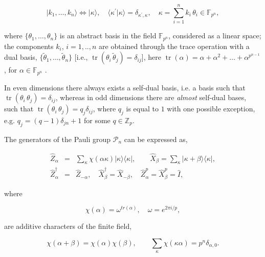 \documentclass[quantumrep,article,submit,pdftex,moreauthors]{Definitions/mdpi}
\DeclareMathOperator{\tr}{tr}
\begin{document}
\begin{equation}
  |k_{1}, \ldots, k_{n}\rangle
  \Leftrightarrow |\kappa\rangle, \quad \langle\kappa^{\prime}|\kappa\rangle
  = \delta_{\kappa^{\prime},\kappa}, \quad \kappa =
  \sum_{i=1}^{n} k_{i} \, \theta_{i} \in \mathbb{F}_{p^{n}},
  \label{basis}
\end{equation}

where $\{\theta_{1},\ldots,\theta_{n}\}$ is an abstract basis in the field
$\mathbb{F}_{p^{n}}$, considered as a linear space; the components $k_{i}$,
$i=1,..,n$ are obtained through the trace operation with a dual basis, $\{
\tilde{\theta}_{1},\ldots ,\tilde{\theta}_{n}\}$ [i.e., $\tr(\theta _{i}\,
\tilde{\theta}_{j})=\delta _{ij}$], here $\tr(\alpha) = \alpha
+\alpha^{2}+\ldots + \alpha ^{p^{n-1}}$, for $\alpha \in \mathbb{F}_{p^{n}}$
\cite{FF}.

In even dimensions there always exists a self-dual basis, i.e. a basis such that
$\tr(\theta_{i}\,\theta_{j})=\delta_{ij}$, whereas in odd dimensions there are
\textit{almost} self-dual bases, such that
$\tr(\theta_{i}\,\theta_{j})=q_{j}\delta_{ij}$, where $q_{j}$ is equal to $1$
with one possible exception, e.g. $q_{j} = (q-1)\delta_{jn}+1$ for some $q \in
\mathbb{Z}_p$.

The generators of the Pauli group $\mathcal{P}_{n}$ can be expressed as,

\begin{eqnarray}
  \hat{Z}_{\alpha }
  &=& \sum_{\kappa } \chi\left( \alpha \kappa \right)
  |\kappa \rangle \langle \kappa|,
  \qquad \hat{X}_{\beta }
  = \sum_{\kappa} |\kappa + \beta \rangle \langle \kappa|,
  \label{XZ} \\
  \hat{Z}_{\alpha }^{\dagger}
  &=& \hat{Z}_{-\alpha}, \quad \hat{X}_{\beta }^{\dagger}
  = \hat{X}_{-\beta}, \quad \hat{Z}_{\alpha}^{p}
  = \hat{X}_{\beta}^{p} = \hat{I},
\end{eqnarray}

where

\begin{equation*}
  \chi \left( \alpha \right)
  = \omega^{tr\left( \alpha \right)},
  \quad \omega = e^{2\pi i / p},
\end{equation*}

are additive characters of the finite field,

\begin{equation*}
  \chi\left( \alpha +\beta \right)
  = \chi\left( \alpha \right) \chi\left( \beta \right),
  \qquad \sum_{\kappa }\chi \left( \kappa \alpha \right)
  = p^{n}\delta_{\alpha, 0}.
\end{equation*}
\end{document}
